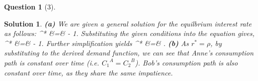 \documentclass{article} %
\def\eQb#1\eQe{\begin{eqnarray*}#1\end{eqnarray*}}
\theoremstyle{quest}
\newtheorem*{question}{Question}
\newtheorem*{solution}{Solution}
\begin{document}
\bigskip

\begin{question}[3]
\end{question}
\begin{solution}
\textbf{(a)}
We are given a general solution for the equilbrium interest rate as follows:
\eQb
r^* &=&  - 1.
\eQe
Substituting the given conditions into the equation gives,
\eQb
r^* &=&  - 1.
\eQe
Further simplification yields
\eQb
r^* &=& \rho.
\eQe
\textbf{(b)} As $r^* = \rho$, by substituting to the derived demand function,
we can see that Anne's consumption path is constant over time (i.e. ${C_1}^{A} = {C_2}^{B}$).
Bob's consumption path is also constant over time, as they share the same impatience.
\end{solution}
\end{document}
